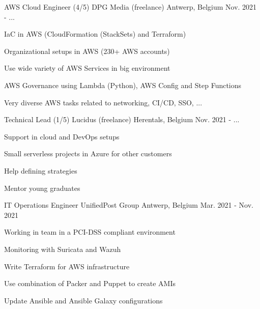 

\begin{cventries}

  \cventry
    {AWS Cloud Engineer (4/5)} %
    {DPG Media (freelance)} %
    {Antwerp, Belgium} %
    {Nov. 2021 - ...} %
    {
      \begin{cvitems} %
        \item {IaC in AWS (CloudFormation (StackSets) and Terraform)}
        \item {Organizational setups in AWS (230+ AWS accounts)}
        \item {Use wide variety of AWS Services in big environment}
        \item {AWS Governance using Lambda (Python), AWS Config and Step Functions}
        \item {Very diverse AWS tasks related to networking, CI/CD, SSO, ...}
      \end{cvitems}
    }

  \cventry
    {Technical Lead (1/5)} %
    {Lucidus (freelance)} %
    {Herentals, Belgium} %
    {Nov. 2021 - ...} %
    {
      \begin{cvitems} %
        \item {Support in cloud and DevOps setups}
        \item {Small serverless projects in Azure for other customers}
        \item {Help defining strategies}
        \item {Mentor young graduates}
      \end{cvitems}
    }

  \cventry
    {IT Operations Engineer} %
    {UnifiedPost Group} %
    {Antwerp, Belgium} %
    {Mar. 2021 - Nov. 2021} %
    {
      \begin{cvitems} %
        \item {Working in team in a PCI-DSS compliant environment}
        \item {Monitoring with Suricata and Wazuh}
        \item {Write Terraform for AWS infrastructure}
        \item {Use combination of Packer and Puppet to create AMIs}
        \item {Update Ansible and Ansible Galaxy configurations}
      \end{cvitems}
    }


\end{cventries}
